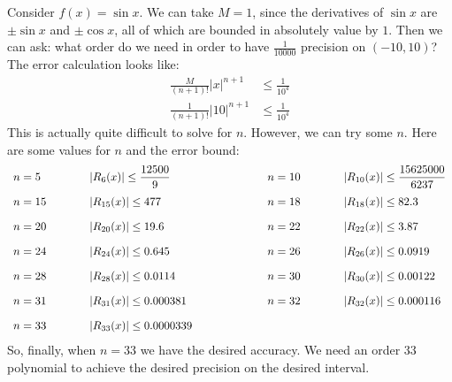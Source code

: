 \documentclass[fleqn,letterpaper]{report}
\begin{document}
\begin{example}
Consider $f(x) = \sin x$. We can take $M=1$, since the
derivatives of $\sin x$ are $\pm \sin x$ and $\pm \cos x$, all
of which are bounded in absolutely value by $1$. Then we can
ask: what order do we need in order to have $\frac{1}{10000}$
precision on $(-10,10)$? The error calculation looks like:
\begin{align*}
\frac{M}{(n+1)!} |x|^{n+1} & \leq \frac{1}{10^4} \\
\frac{1}{(n+1)!} |10|^{n+1} & \leq \frac{1}{10^4} 
\end{align*}
This is actually quite difficult to solve for $n$. However,
we can try some $n$. Here are some values for $n$ and the
error bound:
\begin{displaymath}
\begin{array}{*4{>{\displaystyle}l}}
n=5 \hspace{1cm} & |R_6(x)| \leq \frac{12500}{9} &
\hspace{2cm} n=10 \hspace{1cm} & |R_{10}(x)| \leq
\frac{15625000}{6237} \\[1em]
n=15 \hspace{1cm} & |R_{15}(x)| \leq 477 &
\hspace{2cm} n=18 \hspace{1cm} & |R_{18}(x)| \leq 82.3 \\[1em]
n=20 \hspace{1cm} & |R_{20}(x)| \leq 19.6 &
\hspace{2cm} n=22 \hspace{1cm} & |R_{22}(x)| \leq 3.87 \\[1em]
n=24 \hspace{1cm} & |R_{24}(x)| \leq 0.645 &
\hspace{2cm} n=26 \hspace{1cm} & |R_{26}(x)| \leq 0.0919
\\[1em]
n=28 \hspace{1cm} & |R_{28}(x)| \leq 0.0114 &
\hspace{2cm} n=30 \hspace{1cm} & |R_{30}(x)| \leq 0.00122
\\[1em]
n=31 \hspace{1cm} & |R_{31}(x)| \leq 0.000381 &
\hspace{2cm} n=32 \hspace{1cm} & |R_{32}(x)| \leq 0.000116
\\[1em]
n=33 \hspace{1cm} & |R_{33}(x)| \leq 0.0000339 & & 
\end{array}
\end{displaymath}
So, finally, when $n=33$ we have the desired accuracy. We need
an order $33$ polynomial to achieve the desired precision on
the desired interval.


\end{example}
\end{document}
